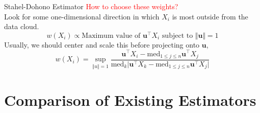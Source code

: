 \documentclass[10pt,xcolor=svgnames]{beamer} %
\newcommand{\tr}{^{\intercal}}
\newcommand{\med}{\text{med}}
\newcommand{\bb}[1]{\boldsymbol{#1}}
\begin{document}
\begin{frame}{Stahel-Dohono Estimator}
    \textcolor{red}{How to choose these weights?}\\
    Look for some one-dimensional direction in which $X_i$ is most outside from the data cloud.\\
    \begin{equation*}
        w(X_i) \propto \text{Maximum value of } \bb{u}\tr X_i \text{ subject to } \Vert \bb{u}\Vert = 1
    \end{equation*}
    Usually, we should center and scale this before projecting onto $\bb{u}$,
    \begin{equation*}
        w(X_i) = \sup_{\Vert u\Vert = 1} \dfrac{\bb{u}\tr X_i  - \med_{1\leq j \leq n} \bb{u}\tr X_j }{\med_k \vert \bb{u}\tr X_k - \med_{1\leq j \leq n} \bb{u}\tr X_j \vert}
    \end{equation*}
\end{frame}

\section{Comparison of Existing Estimators}
\end{document}

